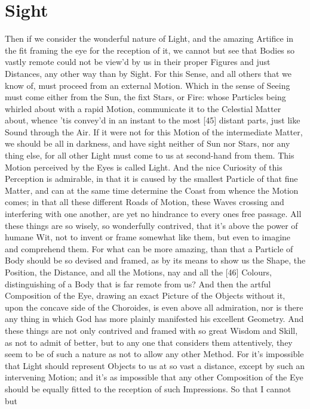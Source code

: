 \documentclass[letterpaper]{book}
\begin{document}
\section{Sight}

Then if we consider the wonderful nature of Light, and the amazing Artifice
in the fit framing the eye for the reception of it, we cannot but see that
Bodies so vastly remote could not be view'd by us in their proper Figures
and just Distances, any other way than by Sight. For this Sense, and all
others that we know of, must proceed from an external Motion. Which in the
sense of Seeing must come either from the Sun, the fixt Stars, or Fire:
whose Particles being whirled about with a rapid Motion, communicate it to
the Celestial Matter about, whence 'tis convey'd in an instant to the most
[45] distant parts, just like Sound through the Air. If it were not for this
Motion of the intermediate Matter, we should be all in darkness, and have
sight neither of Sun nor Stars, nor any thing else, for all other Light must
come to us at second-hand from them. This Motion perceived by the Eyes is
called Light. And the nice Curiosity of this Perception is admirable, in
that it is caused by the smallest Particle of that fine Matter, and can at
the same time determine the Coast from whence the Motion comes; in that all
these different Roads of Motion, these Waves crossing and interfering with
one another, are yet no hindrance to every ones free passage. All these
things are so wisely, so wonderfully contrived, that it's above the power of
humane Wit, not to invent or frame somewhat like them, but even to imagine
and comprehend them. For what can be more amazing, than that a Particle of
Body should be so devised and framed, as by its means to show us the Shape,
the Position, the Distance, and all the Motions, nay and all the [46]
Colours, distinguishing of a Body that is far remote from us? And then the
artful Composition of the Eye, drawing an exact Picture of the Objects
without it, upon the concave side of the Choroides, is even above all
admiration, nor is there any thing in which God has more plainly manifested
his excellent Geometry. And these things are not only contrived and framed
with so great Wisdom and Skill, as not to admit of better, but to any one
that considers them attentively, they seem to be of such a nature as not to
allow any other Method. For it's impossible that Light should represent
Objects to us at so vast a distance, except by such an intervening Motion;
and it's as impossible that any other Composition of the Eye should be
equally fitted to the reception of such Impressions. So that I cannot but
\end{document}

